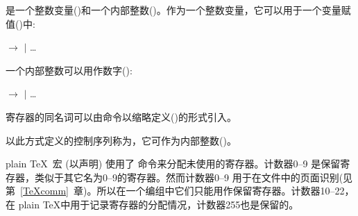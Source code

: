 \documentclass{book}
\begin{document}
\begin{Disp}\end{Disp}

是一个整数变量()和一个内部整数()。作为一个整数变量，它可以用于一个变量赋值()中:

\begin{Disp} $\longrightarrow$
      $|$ \dots\end{Disp}
     

一个内部整数可以用作数字():
\begin{Disp} $\rightarrow$ 
     $|$ \dots
\end{Disp}


寄存器的同名词可以由命令以缩略定义()的形式引入。

\begin{Disp}
\end{Disp} 

以此方式定义的控制序列称为，它可作为内部整数()。


plain \TeX\ 宏  (以声明) 使用了 命令来分配未使用的寄存器。计数器0--9 是保留寄存器，类似于其它名为0--9的寄存器。然而计数器0--9 用于在文件中的页面识别(见第~\ref{TeXcomm}~章)。所以在一个编组中它们只能用作保留寄存器。计数器10--22，在 plain \TeX 中用于记录寄存器的分配情况，计数器255也是保留的。
\end{document}
